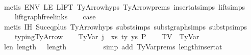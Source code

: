 \begin{isabellebody}
\ \ \ \ \isamarkupfalse%
\ {\isacharparenleft}{\kern0pt}metis\ ENV\ LE\ LIFT{}\ TyArrow{\isachardot}{\kern0pt}hyps{\isacharparenleft}{\kern0pt}{}{\isacharparenright}{\kern0pt}\ TyArrow{\isachardot}{\kern0pt}prems{\isacharparenleft}{\kern0pt}{}{\isacharcomma}{\kern0pt}{}{\isacharparenright}{\kern0pt}\ insert{\isacharunderscore}{\kern0pt}at{\isachardot}{\kern0pt}simps{\isacharparenleft}{\kern0pt}{}{\isacharparenright}{\kern0pt}\ lift{\isachardot}{\kern0pt}simps{\isacharparenleft}{\kern0pt}{}{\isacharparenright}{\kern0pt}\isanewline
\ \ \ \ lift{\isacharunderscore}{\kern0pt}graph{\isacharunderscore}{\kern0pt}freelinks{\isacharparenright}{\kern0pt}\isanewline
\ \ \isamarkupfalse%
\ {\isacharquery}{\kern0pt}case\isanewline
\ \ \ \ \isamarkupfalse%
\ {\isacharparenleft}{\kern0pt}metis\ IH\ Suc{\isacharunderscore}{\kern0pt}eq{\isacharunderscore}{\kern0pt}plus{}\ TyArrow{\isachardot}{\kern0pt}hyps{\isacharparenleft}{\kern0pt}{}{\isacharcomma}{\kern0pt}{}{\isacharparenright}{\kern0pt}\ subst{\isachardot}{\kern0pt}simps{\isacharparenleft}{\kern0pt}{}{\isacharparenright}{\kern0pt}\ subst{\isacharunderscore}{\kern0pt}graph{\isachardot}{\kern0pt}simps{\isacharparenleft}{\kern0pt}{}{\isacharparenright}{\kern0pt}\ subst{\isacharunderscore}{\kern0pt}p{\isachardot}{\kern0pt}simps{\isacharparenleft}{\kern0pt}{}{\isacharparenright}{\kern0pt}\isanewline
\ \ \ \ typing{\isachardot}{\kern0pt}TyArrow{\isacharparenright}{\kern0pt}\isanewline
\isanewline
{}\isamarkupfalse%
\isanewline
\ \ \isamarkupfalse%
\ {\isacharparenleft}{\kern0pt}TyVar\ j\ {\isasymGamma}\ xs{\isacharprime}{\kern0pt}\ ty{\isacharprime}{\kern0pt}\ ys\ P{\isacharparenright}{\kern0pt}\isanewline
\ \ \isamarkupfalse%
\ TV\ {\isacharequal}{\kern0pt}\ TyVar\isanewline
\isanewline
\ \ \isamarkupfalse%
\ len{\isacharunderscore}{\kern0pt}{\isasymGamma}{}{\isacharcolon}{\kern0pt}\ {\isachardoublequoteopen}length\ {\isasymGamma}\ {\isacharequal}{\kern0pt}\ length\ {\isasymGamma}{}\ {\isacharplus}{\kern0pt}\ {}{\isachardoublequoteclose}\isanewline
\ \ \ \ \ \isamarkupfalse%
\ {\isacharparenleft}{\kern0pt}simp\ add{\isacharcolon}{\kern0pt}\ TyVar{\isachardot}{\kern0pt}prems{\isacharparenleft}{\kern0pt}{}{\isacharparenright}{\kern0pt}\ length{\isacharunderscore}{\kern0pt}insert{\isacharunderscore}{\kern0pt}at{\isacharparenright}{\kern0pt}\isanewline

\end{isabellebody}
